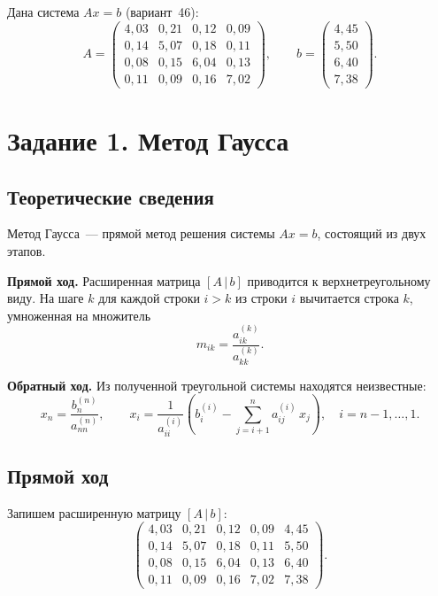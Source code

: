\documentclass[a4paper, final]{article}
\begin{document}
Дана система $Ax = b$ (вариант~46):
\[
A = \begin{pmatrix}
4{,}03 & 0{,}21 & 0{,}12 & 0{,}09 \\
0{,}14 & 5{,}07 & 0{,}18 & 0{,}11 \\
0{,}08 & 0{,}15 & 6{,}04 & 0{,}13 \\
0{,}11 & 0{,}09 & 0{,}16 & 7{,}02
\end{pmatrix}, \qquad
b = \begin{pmatrix}
4{,}45 \\ 5{,}50 \\ 6{,}40 \\ 7{,}38
\end{pmatrix}.
\]

\newpage

\section{Задание 1. Метод Гаусса}

\subsection{Теоретические сведения}

Метод Гаусса~--- прямой метод решения системы $Ax = b$, состоящий из двух этапов.

\textbf{Прямой ход.} Расширенная матрица $[A\,|\,b]$ приводится к верхнетреугольному
виду. На шаге $k$ для каждой строки $i > k$ из строки $i$ вычитается строка $k$,
умноженная на множитель
\[
m_{ik} = \frac{a_{ik}^{(k)}}{a_{kk}^{(k)}}.
\]

\textbf{Обратный ход.} Из полученной треугольной системы находятся неизвестные:
\[
x_n = \frac{b_n^{(n)}}{a_{nn}^{(n)}}, \qquad
x_i = \frac{1}{a_{ii}^{(i)}}\!\left(b_i^{(i)} - \sum_{j=i+1}^{n} a_{ij}^{(i)}\,x_j\right),
\quad i = n-1, \ldots, 1.
\]

\subsection{Прямой ход}

Запишем расширенную матрицу $[A\,|\,b]$:
\[
\left(\begin{array}{cccc|c}
4{,}03 & 0{,}21 & 0{,}12 & 0{,}09 & 4{,}45 \\
0{,}14 & 5{,}07 & 0{,}18 & 0{,}11 & 5{,}50 \\
0{,}08 & 0{,}15 & 6{,}04 & 0{,}13 & 6{,}40 \\
0{,}11 & 0{,}09 & 0{,}16 & 7{,}02 & 7{,}38
\end{array}\right).
\]
\end{document}
